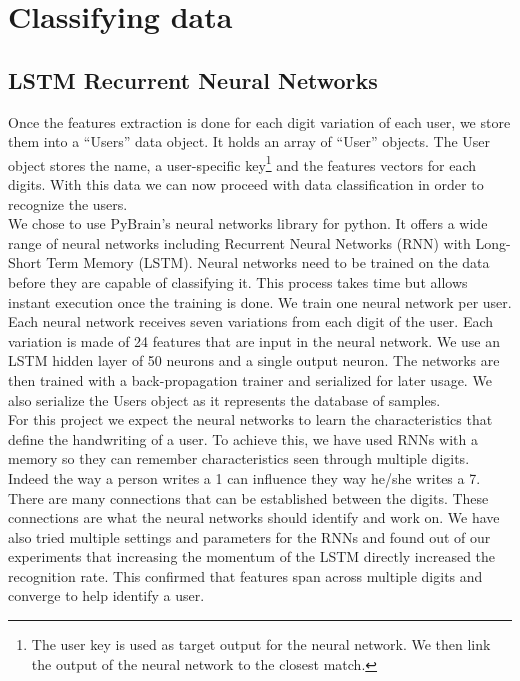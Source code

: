 \documentclass[a4paper]{article}
\begin{document}
{\section{Classifying data}
\subsection{LSTM Recurrent Neural Networks}

Once the features extraction is done for each digit variation of each user, we store them into a “Users” data object. It holds an array of “User” objects. The User object stores the name, a user-specific key\footnote{The user key is used as target output for the neural network. We then link the output of the neural network to the closest match.} and the features vectors for each digits. With this data we can now proceed with data classification in order to recognize the users.\\

We chose to use PyBrain’s neural networks library for python. It offers a wide range of neural networks including Recurrent Neural Networks (RNN) with Long-Short Term Memory (LSTM). Neural networks need to be trained on the data before they are capable of classifying it. This process takes time but allows instant execution once the training is done. We train one neural network per user. Each neural network receives seven variations from each digit of the user. Each variation is made of 24 features that are input in the neural network. We use an LSTM hidden layer of 50 neurons and a single output neuron. The networks are then trained with a back-propagation trainer and serialized for later usage. We also serialize the Users object as it represents the database of samples.\\

For this project we expect the neural networks to learn the characteristics that define the handwriting of a user. To achieve this, we have used RNNs with a memory so they can remember characteristics seen through multiple digits. Indeed the way a person writes a 1 can influence they way he/she writes a 7. There are many connections that can be established between the digits. These connections are what the neural networks should identify and work on. We have also tried multiple settings and parameters for the RNNs and found out of our experiments that increasing the momentum of the LSTM directly increased the recognition rate. This confirmed that features span across multiple digits and converge to help identify a user.\\

}
\end{document}
